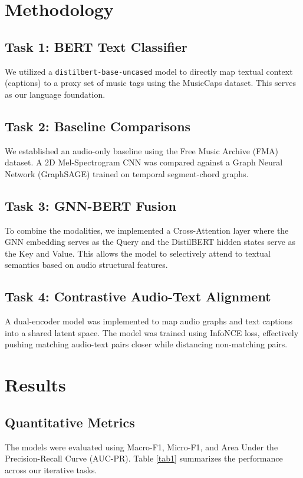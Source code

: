 \documentclass[conference]{IEEEtran}
\begin{document}
\section{Methodology}
\subsection{Task 1: BERT Text Classifier}
We utilized a \texttt{distilbert-base-uncased} model to directly map textual context (captions) to a proxy set of music tags using the MusicCaps dataset. This serves as our language foundation.

\subsection{Task 2: Baseline Comparisons}
We established an audio-only baseline using the Free Music Archive (FMA) dataset. A 2D Mel-Spectrogram CNN was compared against a Graph Neural Network (GraphSAGE) trained on temporal segment-chord graphs. 

\subsection{Task 3: GNN-BERT Fusion}
To combine the modalities, we implemented a Cross-Attention layer where the GNN embedding serves as the Query and the DistilBERT hidden states serve as the Key and Value. This allows the model to selectively attend to textual semantics based on audio structural features.

\subsection{Task 4: Contrastive Audio-Text Alignment}
A dual-encoder model was implemented to map audio graphs and text captions into a shared latent space. The model was trained using InfoNCE loss, effectively pushing matching audio-text pairs closer while distancing non-matching pairs.

\section{Results}
\subsection{Quantitative Metrics}
The models were evaluated using Macro-F1, Micro-F1, and Area Under the Precision-Recall Curve (AUC-PR). Table \ref{tab1} summarizes the performance across our iterative tasks.
\end{document}
